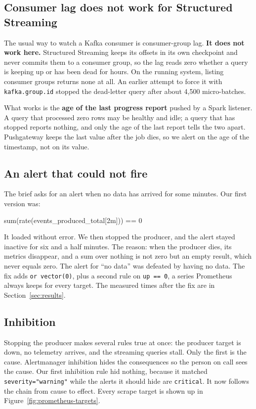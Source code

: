 \documentclass[11pt,a4paper]{article}
\begin{document}
\subsection{Consumer lag does not work for Structured Streaming}

The usual way to watch a Kafka consumer is consumer-group lag. \textbf{It does not work
here.} Structured Streaming keeps its offsets in its own checkpoint and never commits
them to a consumer group, so the lag reads zero whether a query is keeping up or has
been dead for hours. On the running system, listing consumer groups returns none at
all. An earlier attempt to force it with \texttt{kafka.group.id} stopped the
dead-letter query after about 4{,}500 micro-batches.

What works is the \textbf{age of the last progress report} pushed by a Spark listener.
A query that processed zero rows may be healthy and idle; a query that has stopped
reports nothing, and only the age of the last report tells the two apart. Pushgateway
keeps the last value after the job dies, so we alert on the age of the timestamp, not
on its value.

\subsection{An alert that could not fire}

The brief asks for an alert when no data has arrived for some minutes. Our first
version was:

\begin{center}\ttfamily\small
sum(rate(events\_produced\_total[2m])) == 0
\end{center}

It loaded without error. We then stopped the producer, and the alert stayed inactive
for six and a half minutes. The reason: when the producer dies, its metrics disappear,
and a sum over nothing is not zero but an empty result, which never equals zero. The
alert for ``no data'' was defeated by having no data. The fix adds \texttt{or
vector(0)}, plus a second rule on \texttt{up == 0}, a series Prometheus always keeps
for every target. The measured times after the fix are in Section~\ref{sec:results}.

\subsection{Inhibition}

Stopping the producer makes several rules true at once: the producer target is down,
no telemetry arrives, and the streaming queries stall. Only the first is the cause.
Alertmanager inhibition hides the consequences so the person on call sees the cause.
Our first inhibition rule hid nothing, because it matched \texttt{severity="warning"}
while the alerts it should hide are \texttt{critical}. It now follows the chain from
cause to effect. Every scrape target is shown up in Figure~\ref{fig:prometheus-targets}.
\end{document}
